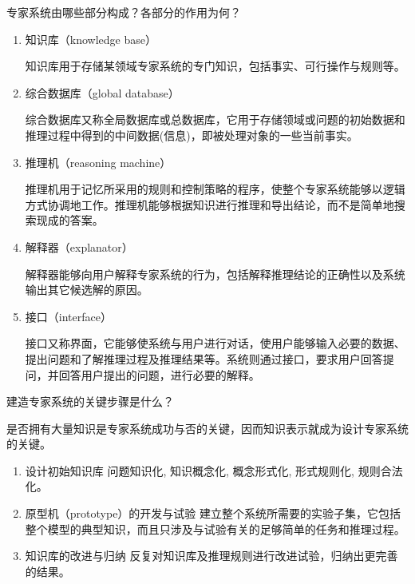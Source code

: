 \begin{question}
专家系统由哪些部分构成？各部分的作用为何？
\end{question}
\begin{solution}
	\begin{enumerate}
		\item 知识库（knowledge base）\par
		知识库用于存储某领域专家系统的专门知识，包括事实、可行操作与规则等。 
		\item 综合数据库（global database）\par
		综合数据库又称全局数据库或总数据库，它用于存储领域或问题的初始数据和推理过程中得到的中间数据(信息)，即被处理对象的一些当前事实。  
		\item 推理机（reasoning machine）\par
		推理机用于记忆所采用的规则和控制策略的程序，使整个专家系统能够以逻辑方式协调地工作。推理机能够根据知识进行推理和导出结论，而不是简单地搜索现成的答案。
		\item 解释器（explanator）\par
		解释器能够向用户解释专家系统的行为，包括解释推理结论的正确性以及系统输出其它候选解的原因。 
		\item 接口（interface）\par
		接口又称界面，它能够使系统与用户进行对话，使用户能够输入必要的数据、提出问题和了解推理过程及推理结果等。系统则通过接口，要求用户回答提问，并回答用户提出的问题，进行必要的解释。
	\end{enumerate}
\end{solution}

\begin{question}
建造专家系统的关键步骤是什么？
\end{question}
\begin{solution}
是否拥有大量知识是专家系统成功与否的关键，因而知识表示就成为设计专家系统的关键。
	\begin{enumerate}
		\item 设计初始知识库 
		问题知识化, 知识概念化, 概念形式化, 形式规则化, 规则合法化。
		\item 原型机（prototype）的开发与试验 
		建立整个系统所需要的实验子集，它包括整个模型的典型知识，而且只涉及与试验有关的足够简单的任务和推理过程。
		\item 知识库的改进与归纳 
		反复对知识库及推理规则进行改进试验，归纳出更完善的结果。
	\end{enumerate}
\end{solution}

